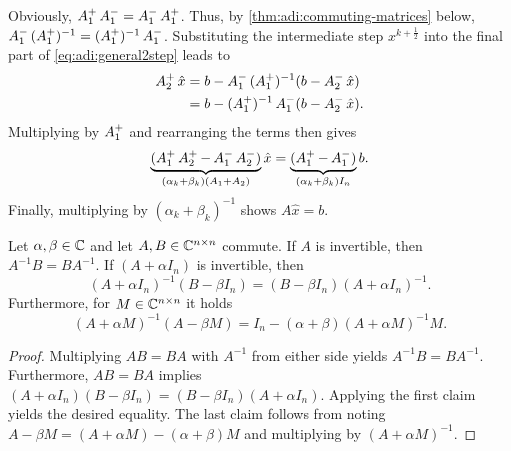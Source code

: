 Obviously, $\mathop{A_1^+}\mathop{A_1^-} = \mathop{A_1^-}\mathop{A_1^+}$.
Thus, by \autoref{thm:adi:commuting-matrices} below, $\mathop{A_1^-}\mathop{(\mathop{A_1^+})^{-1}} = \mathop{(\mathop{A_1^+})^{-1}}\mathop{A_1^-}$.
Substituting the intermediate step $x^{k+\frac{1}{2}}$ into the final part of \eqref{eq:adi:general2step} leads to
\begin{align*}
  \mathop{A_2^+} \hat x
  &= b - \mathop{A_1^-} \mathop{(\mathop{A_1^+})^{-1}} (b - \mathop{A_2^-} \hat x) \\
  &= b - \mathop{(\mathop{A_1^+})^{-1}} \mathop{A_1^-} (b - \mathop{A_2^-} \hat x)
  .
\end{align*}
Multiplying by $\mathop{A_1^+}$ and rearranging the terms then gives
\begin{equation*}
  \underbrace{%
  (\Aip \Aiip - \Aim \Aiim)
  }_{(\alpha_k + \beta_k) (A_1+A_2)}
  \hat x =
  \underbrace{%
  (\Aip - \Aim)
  }_{(\alpha_k + \beta_k) I_n}
  b
  .
\end{equation*}
Finally, multiplying by $(\alpha_k + \beta_k)^{-1}$ shows $A \hat x = b$.

\begin{lemma}
\label{thm:adi:commuting-matrices}
  Let $\alpha, \beta\in\mathbb{C}$ and let $A, B \in\mathbb{C}^{n\times n}$ commute.
  If $A$ is invertible, then $A^{-1}B = BA^{-1}$.
  If $(A+\alpha I_n)$ is invertible, then
  \begin{equation*}
    (A+\alpha I_n)^{-1} (B-\beta I_n)
    = (B-\beta I_n) (A+\alpha I_n)^{-1}
    .
  \end{equation*}
  Furthermore, for $M\in\mathbb{C}^{n\times n}$ it holds
  \begin{equation*}
    (A+\alpha M)^{-1} (A-\beta M)
    = I_n - (\alpha+\beta) (A+\alpha M)^{-1} M
    .
  \end{equation*}
\end{lemma}
\begin{proof}
  Multiplying $AB=BA$ with $A^{-1}$ from either side yields $A^{-1}B=BA^{-1}$.
  Furthermore, $AB=BA$ implies
  $
    (A+\alpha I_n) (B-\beta I_n)
    =
    (B-\beta I_n) (A+\alpha I_n)
  $.
  Applying the first claim yields the desired equality.
  The last claim follows from noting
  $A-\beta M = (A+\alpha M) - (\alpha+\beta)M$
  and multiplying by $(A+\alpha M)^{-1}$.
\end{proof}

